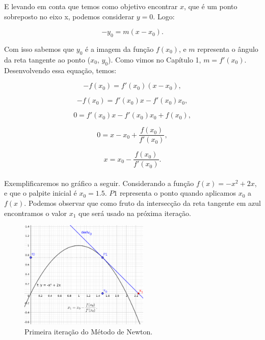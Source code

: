 E levando em conta que temos como objetivo encontrar $x$, que é um ponto
sobreposto no eixo x, podemos considerar $y=0$. Logo:

\begin{equation}
    -y_0=m(x-x_0).
\end{equation}

Com isso sabemos que $y_0$ é a imagem da função $f(x_0)$, e $m$ representa o
ângulo da reta tangente ao ponto ($x_0$, $y_0$). Como vimos no Capítulo 1,
 $m=f'(x_0)$. Desenvolvendo essa equação, temos:

\begin{equation}
    -f(x_0) = f'(x_0)(x-x_0),
\end{equation}

\begin{equation}
    -f(x_0) = f'(x_0)x - f'(x_0)x_0,
\end{equation}

\begin{equation}
    0 = f'(x_0)x - f'(x_0)x_0+f(x_0),
\end{equation}

\begin{equation}
    0 = x - x_0 + \frac{f(x_0)}{f'(x_0)},
\end{equation}

\begin{equation}
    x = x_0 - \frac {f(x_0)}{f'(x_0)}.
\end{equation}\\

Exemplificaremos no gráfico a seguir. Considerando a função $f(x)=-x^2+2x$, e
que o palpite inicial é $x_0=1.5$. $P1$ representa o ponto quando aplicamos
$x_0$ a $f(x)$. Podemos observar que como fruto da intersecção da reta tangente
em azul encontramos o valor $x_1$ que será usado na próxima iteração.

\begin{figure}[ht]
    \includegraphics[width=0.55\textwidth]
      {src/MetodoNewton_grafico_1.png}
    \centering
    \caption{
      Primeira iteração do Método de Newton.
     }
    \label{MetodoNewton_grafico_1}
\end{figure}


